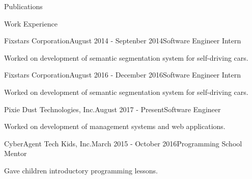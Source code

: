 \documentclass{resume} %
\begin{document}
\begin{rSection}{Publications}

\end{rSection}

\begin{rSection}{Work Experience}

    \begin{rSubsection}{Fixstars Corporation}{August 2014 - Septenber 2014}{Software Engineer Intern}{}
    \item Worked on development of semantic segmentation system for self-driving cars.
    \end{rSubsection}

    \begin{rSubsection}{Fixstars Corporation}{August 2016 - December 2016}{Software Engineer Intern}{}
    \item Worked on development of semantic segmentation system for self-driving cars.
    \end{rSubsection}

    \begin{rSubsection}{Pixie Dust Technologies, Inc.}{August 2017 - Present}{Software Engineer}{}
    \item Worked on development of management systems and web applications.
    \end{rSubsection}

    \begin{rSubsection}{CyberAgent Tech Kids, Inc.}{March 2015 - October 2016}{Programming School Mentor}{}
    \item Gave children introductory programming lessons.
    \end{rSubsection}
\end{rSection}
\end{document}

